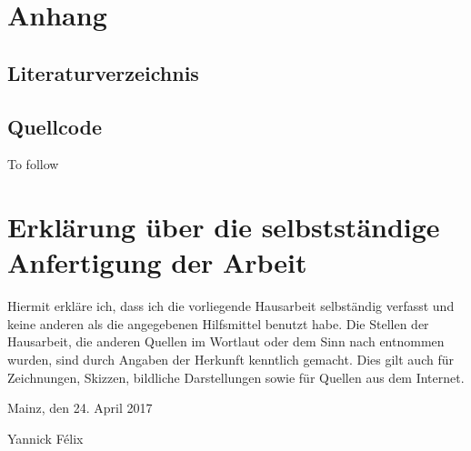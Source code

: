 \documentclass[a4paper,12pt,ngerman]{scrartcl}      %
\let\oldcite\cite
\renewcommand{\cite}[1]{\textsuperscript{\oldcite{#1}}}
\begin{document}
	\section{Anhang}
	\subsection{Literaturverzeichnis}
	\printbibliography[heading=none]
	
	\subsection{Quellcode}
	To follow
	
	\newpage
	\section{Erklärung über die selbstständige Anfertigung der Arbeit}
	Hiermit erkläre ich, dass ich die vorliegende Hausarbeit selbständig verfasst und keine anderen als die angegebenen Hilfsmittel benutzt habe.
	Die Stellen der Hausarbeit, die anderen Quellen im Wortlaut oder dem Sinn nach entnommen wurden, sind durch Angaben der Herkunft kenntlich gemacht. Dies gilt auch für Zeichnungen, Skizzen, bildliche Darstellungen sowie für Quellen aus dem Internet.\cite{erklaerung}\par
	\vspace{0.5cm}
	\noindent Mainz, den 24. April 2017\par
	\vspace{2cm}
	\noindent Yannick F\'{e}lix
	\vfill
	\doclicenseThis
\end{document}
